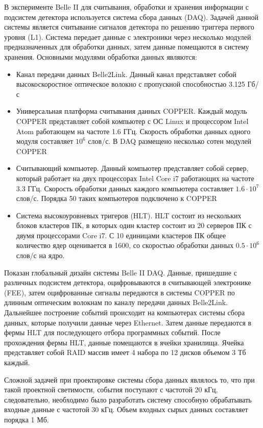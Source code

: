 В эксперименте Belle II для считывания, обработки и хранения информации с подсистем детектора используется система сбора данных (DAQ). Задачей данной системы является считывание сигналов детектора по решению триггера первого уровня (L1). Система передает данные с электроники через несколько модулей предназначенных для обработки данных, затем данные помещаются в систему хранения. Основными модулями обработки данных являются:
\begin{itemize}
  \item Канал передачи данных Belle2Link. Данный канал представляет собой высокоскоростное оптическое волокно с пропускной способностью 3.125 Гб/с
  \item Универсальная платформа считывания данных COPPER. Каждый модуль COPPER представляет собой компьютер с ОС Linux и процессором Intel Atom работающем на частоте 1.6 ГГц. Скорость обработки данных одного модуля составляет $10^6$ слов/с. В DAQ размещено несколько сотен модулей COPPER
  \item Считывающий компьютер. Данный компьютер представляет собой сервер, который  работает на двух процессорах Intel Core i7 работающих на частоте 3.3 ГГц. Скорость обработки данных каждого компьютера составляет $1.6\cdot10^7$ слов/с. Порядка 50 таких компьютеров подключено к COPPER
  \item Система высокоуровневых тригеров (HLT). HLT состоит из нескольких блоков кластеров ПК, в которых один кластер состоит из 20 серверов ПК с двумя процессорами Core i7. С 10 единицами кластеров ПК общее количество ядер оценивается в 1600, со скоростью обработки данных $0.5\cdot10^6$ слов/с на ядро.
\end{itemize}
Показан глобальный дизайн системы Belle II DAQ. Данные, пришедшие с различных подсистем детектора, оцифровываются в считывающей электронике (FEE), затем оцифрованные сигналы передаются в системы COPPER по длинным оптическим волокнам по каналу передачи данных Belle2Link. Дальнейшее построение событий происходит на компьютерах системы сбора данных, которые получили данные через Ethernet. Затем данные передаются в фермы HLT для последующего отбора программных событий. После прохождения фермы HLT, данные помещаются в ячейки хранилища. Ячейка представляет собой RAID массив имеет 4 набора по 12 дисков объемом 3 Тб каждый. \par
  Сложной задачей при проектировке системы сбора данных являлось то, что при такой проектной светимости, события поступают с частотой 20 кГц, следовательно, необходимо было разработать систему способную обрабатывать входные данные с частотой 30 кГц. Объем входных сырых данных составляет порядка 1 Мб.
